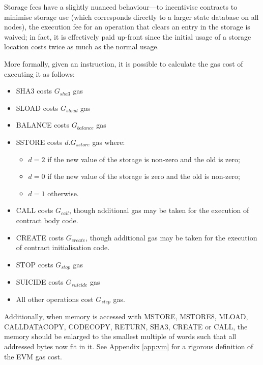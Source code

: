 \documentclass[9pt,oneside]{amsart}
\begin{document}
\begin{multicols}{2}
Storage fees have a slightly nuanced behaviour---to incentivise contracts to minimise storage use (which corresponds directly to a larger state database on all nodes), the execution fee for an operation that clears an entry in the storage is waived; in fact, it is effectively paid up-front since the initial usage of a storage location costs twice as much as the normal usage.

More formally, given an instruction, it is possible to calculate the gas cost of executing it as follows:

\begin{itemize}
\item {\small SHA3} costs $G_{sha3}$ gas
\item {\small SLOAD} costs $G_{sload}$ gas
\item {\small BALANCE} costs $G_{balance}$ gas
\item {\small SSTORE} costs $d.G_{sstore}$ gas where:
\begin{itemize}
\item $d = 2$ if the new value of the storage is non-zero and the old is zero;
\item $d = 0$ if the new value of the storage is zero and the old is non-zero;
\item $d = 1$ otherwise.
\end{itemize}
\item {\small CALL} costs $G_{call}$, though additional gas may be taken for the execution of contract body code.
\item {\small CREATE} costs $G_{create}$, though additional gas may be taken for the execution of contract initialisation code.
\item {\small STOP} costs $G_{stop}$ gas
\item {\small SUICIDE} costs $G_{suicide}$ gas
\item All other operations cost $G_{step}$ gas.
\end{itemize}

Additionally, when memory is accessed with {\small MSTORE}, {\small MSTORE8}, {\small MLOAD}, {\small CALLDATACOPY}, {\small CODECOPY}, {\small RETURN}, {\small SHA3}, {\small CREATE} or {\small CALL}, the memory should be enlarged to the smallest multiple of words such that all addressed bytes now fit in it. See Appendix \ref{app:vm} for a rigorous definition of the EVM gas cost.



\end{multicols}
\end{document}
